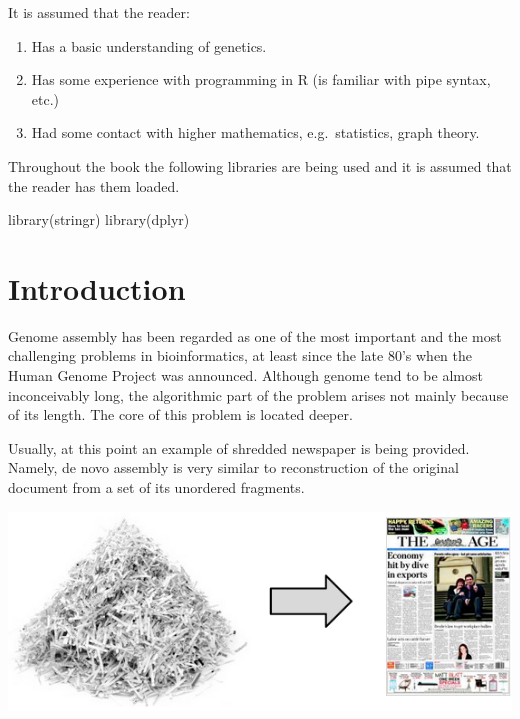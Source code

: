 \documentclass[
]{book}
\newenvironment{Shaded}{\begin{snugshade}}{\end{snugshade}}
\newcommand{\FunctionTok}[1]{\textcolor[rgb]{0.00,0.00,0.00}{#1}}
\newcommand{\NormalTok}[1]{#1}
\begin{document}
It is assumed that the reader:

\begin{enumerate}
\def\labelenumi{\arabic{enumi}.}
\item
  Has a basic understanding of genetics.
\item
  Has some experience with programming in R (is familiar with pipe syntax, etc.)
\item
  Had some contact with higher mathematics, e.g.~statistics, graph theory.
\end{enumerate}

Throughout the book the following libraries are being used and it is assumed that the reader has them loaded.

\begin{Shaded}
\begin{Highlighting}[]
\FunctionTok{library}\NormalTok{(stringr)}
\FunctionTok{library}\NormalTok{(dplyr)}
\end{Highlighting}
\end{Shaded}

\hypertarget{introduction}{%
\chapter{Introduction}\label{introduction}}

Genome assembly has been regarded as one of the most important and the most challenging problems in bioinformatics, at least since the late 80's when the Human Genome Project was announced. Although genome tend to be almost inconceivably long, the algorithmic part of the problem arises not mainly because of its length. The core of this problem is located deeper.

Usually, at this point an example of shredded newspaper is being provided. Namely, de novo assembly is very similar to reconstruction of the original document from a set of its unordered fragments.

\begin{center}\includegraphics[width=0.8\linewidth]{img/intro_assembly} \end{center}
\end{document}
